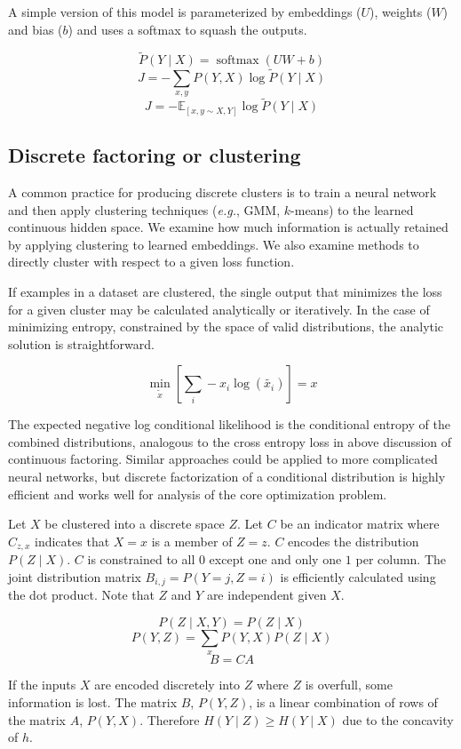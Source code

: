 \documentclass[11pt,letterpaper]{article}
\begin{document}
A simple version of this model is parameterized by embeddings ($U$), weights ($W$) and bias ($b$) and uses a softmax to squash the outputs.

$$ \tilde{P}(Y\mid X) = \operatorname{softmax}(U W+b)$$
$$ J = -\sum_{x, y} P(Y,X) \log \tilde{P}(Y \mid X) $$
$$ J = -\mathbb{E}_{[x,y \sim X, Y]} \log \tilde{P}(Y \mid X) $$

\subsection{Discrete factoring or clustering}

A common practice for producing discrete clusters is to train a neural network and then apply clustering techniques (\textit{e.g.}, GMM, $k$-means) to the learned continuous hidden space. We examine how much information is actually retained by applying clustering to learned embeddings. We also examine methods to directly cluster with respect to a given loss function.

If examples in a dataset are clustered, the single output that minimizes the loss for a given cluster may be calculated analytically or iteratively. In the case of minimizing entropy, constrained by the space of valid distributions, the analytic solution is straightforward.

$$\min_{\tilde{x}}[\sum_i-x_i \log(\tilde{x_i})] = x$$

The expected negative log conditional likelihood is the conditional entropy of the combined distributions, analogous to the cross entropy loss in above discussion of continuous factoring. Similar approaches could be applied to more complicated neural networks, but discrete factorization of a conditional distribution is highly efficient and works well for analysis of the core optimization problem.

Let $X$ be clustered into a discrete space $Z$. Let $C$ be an indicator matrix where $C_{z,x}$ indicates that $X=x$ is a member of $Z=z$. $C$ encodes the distribution $P(Z \mid X)$. $C$ is constrained to all $0$ except one and only one $1$ per column. The joint distribution matrix $B_{i,j}=P(Y=j,Z=i)$ is efficiently calculated using the dot product. Note that $Z$ and $Y$ are independent given $X$.

$$P(Z \mid X,Y) = P(Z \mid X)$$
$$P(Y,Z) = \sum_x P(Y,X) P(Z \mid X)$$
$$B = C A $$ 

If the inputs $X$ are encoded discretely into $Z$ where $Z$ is overfull, some information is lost.  The matrix $B$, $P(Y,Z)$, is a linear combination of rows of the matrix $A$, $P(Y,X)$. Therefore $H(Y \mid Z) \ge H(Y \mid X)$ due to the concavity of $h$. 
\end{document}
